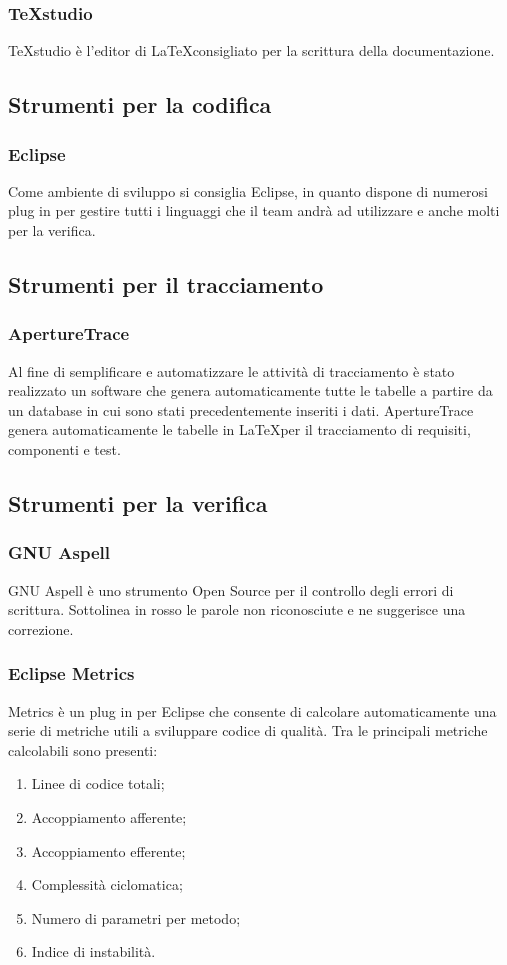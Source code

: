 \subsubsection{TeXstudio}
TeXstudio è l'editor di \LaTeX consigliato per la scrittura della documentazione.

\subsection{Strumenti per la codifica}
\subsubsection{Eclipse}
Come ambiente di sviluppo si consiglia Eclipse, in quanto dispone di numerosi plug in per gestire tutti i linguaggi che il team andrà ad utilizzare e anche molti per la verifica.


\subsection{Strumenti per il tracciamento}

\subsubsection{ApertureTrace}
\label{ApertureTrace}
Al fine di semplificare e automatizzare le attività di tracciamento è stato realizzato un software che genera automaticamente tutte le tabelle a partire da un database in cui sono stati precedentemente inseriti i dati.
ApertureTrace genera automaticamente le tabelle in \LaTeX per il tracciamento di requisiti, componenti e test.


\subsection{Strumenti per la verifica}

\subsubsection{GNU Aspell}
GNU Aspell è uno strumento Open Source per il controllo degli errori di scrittura. Sottolinea in rosso le parole non riconosciute e ne suggerisce una correzione.
\subsubsection{Eclipse Metrics}
Metrics è un plug in per Eclipse che consente di calcolare automaticamente una serie di metriche utili a sviluppare codice di qualità.
Tra le principali metriche calcolabili sono presenti:
\begin{enumerate}
\item Linee di codice totali;
\item Accoppiamento afferente;
\item Accoppiamento efferente;
\item Complessità ciclomatica;
\item Numero di parametri per metodo;
\item Indice di instabilità.
\end{enumerate}

